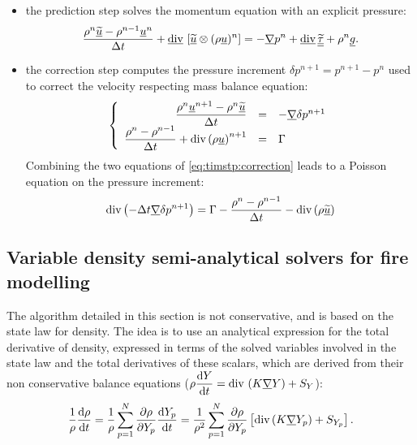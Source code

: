 \begin{itemize}
 \item the prediction step solves the momentum equation with an explicit pressure:
%
\begin{equation}\label{eq:timstp:prediction}
\dfrac{\rho^n \underline{\widetilde{u}} - \rho^{n-1} \underline{u}^n}{\Delta t}
+ \underline{\text{div}}\, \left[\underline{\widetilde{u}} \otimes (\rho \underline{u})^n \right] = -\underline{\nabla} p^n + \underline{\text{div}}\,{\underline{\underline{\widetilde{\tau}}}} + \rho^n\underline{g}.
\end{equation}

 \item the correction step computes the pressure increment $\delta p^{n+1} = p^{n+1} - p^n$
 used to correct the velocity respecting mass balance equation:
\begin{equation}
\left\{
  \begin{array}{r c l}
\dfrac{\rho^n \underline{u}^{n+1} - \rho^n\underline{\widetilde{u}}}{\Delta t} & = & -\underline{\nabla} \delta p^{n+1}\\
\dfrac{\rho^n - \rho^{n-1}}{\Delta t}+\text{div}\,{ \left(\rho \underline{u} \right)}^{n+1} & = & \Gamma
  \end{array}
\right.
\label{eq:timstp:correction}
\end{equation}
Combining the two equations of \eqref{eq:timstp:correction} leads to a Poisson equation on the pressure increment:
\begin{equation}
\text{div}\,{ \left( -\Delta t \underline{\nabla} \delta p^{n+1} \right) } = \Gamma
- \dfrac{\rho^n - \rho^{n-1}}{\Delta t} - \text{div}\,{ \left( \rho \underline{\widetilde{u}} \right) }
\end{equation}

\end{itemize}


\subsection{Variable density semi-analytical solvers for fire modelling}
The algorithm detailed in this section is not conservative, and
is based on the state law for density.
The idea is to use an analytical expression for the total derivative of density,
expressed in terms of the solved variables
involved in the state law and the total derivatives of these scalars,
which are derived
from their non conservative balance equations ($\rho \dfrac{\mathrm{d} Y}{\mathrm{d} t} = \text{div}\, \left(K \underline{\nabla} Y \right)+ S_Y $):
\begin{equation}
\dfrac{1}{\rho}\dfrac{\mathrm{d} \rho}{\mathrm{d} t} = \dfrac{1}{\rho} \sum_{p=1}^N \dfrac{\partial \rho}{\partial Y_p}
\dfrac{\mathrm{d} Y_p}{\mathrm{d} t} = \dfrac{1}{\rho^2} \sum_{p=1}^N \dfrac{\partial \rho}{\partial Y_p} \left[\text{div}\,{ \left( K \underline{\nabla} {Y_p} \right) }+S_{Y_p}\right].
\label{eq:timstp:total_derivative}
\end{equation}

